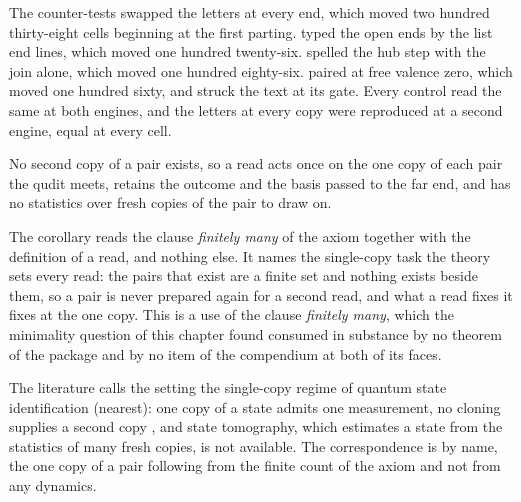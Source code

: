 \begin{chproof}[census]
The counter-tests swapped the letters at every end, which moved two hundred thirty-eight cells beginning at the first parting. typed the open ends by the list end lines, which moved one hundred twenty-six. spelled the hub step with the join alone, which moved one hundred eighty-six. paired at free valence zero, which moved one hundred sixty, and struck the text at its gate. Every control read the same at both engines, and the letters at every copy were reproduced at a second engine, equal at every cell.
\end{chproof}
\begin{chtheorem}\label{box:I-1-axiom-and-the-six-definitions:10}
No second copy of a pair exists, so a read acts once on the one copy of each pair the qudit meets, retains the outcome and the basis passed to the far end, and has no statistics over fresh copies of the pair to draw on.
\end{chtheorem}
The corollary reads the clause \emph{finitely many} of the axiom together with the definition of a read, and nothing else. It names the single-copy task the theory sets every read: the pairs that exist are a finite set and nothing exists beside them, so a pair is never prepared again for a second read, and what a read fixes it fixes at the one copy. This is a use of the clause \emph{finitely many}, which the minimality question of this chapter found consumed in substance by no theorem of the package and by no item of the compendium at both of its faces.
\begin{chbridge}
The literature calls the setting the single-copy regime of quantum state identification (nearest): one copy of a state admits one measurement, no cloning supplies a second copy \cite{WoottersZurek1982}, and state tomography, which estimates a state from the statistics of many fresh copies, is not available. The correspondence is by name, the one copy of a pair following from the finite count of the axiom and not from any dynamics.
\end{chbridge}
